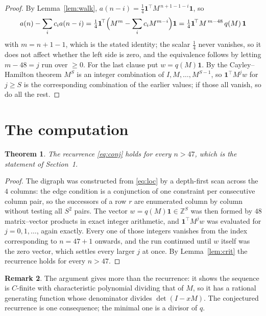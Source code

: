 \documentclass[11pt,a4paper]{article}
\theoremstyle{plain}
\newtheorem{theorem}{Theorem}
\theoremstyle{definition}
\newtheorem{remark}[theorem]{Remark}
\begin{document}
\begin{proof}
By Lemma~\ref{lem:walk}, $a(n-i)=\tfrac1{4}\mathbf{1}^{\!\top}M^{\,n+1-1-i}\mathbf{1}$, so
\[
a(n)-\sum_i c_i a(n-i)
=\tfrac1{4}\mathbf{1}^{\!\top}\Bigl(M^{m}-\sum_i c_i M^{m-i}\Bigr)\mathbf{1}
=\tfrac1{4}\mathbf{1}^{\!\top}M^{\,m-48}\,q(M)\,\mathbf{1}
\]
with $m=n+1-1$, which is the stated identity; the scalar $\tfrac1{4}$ never vanishes, so it does not affect whether the left side is zero, and the equivalence follows by letting
$m-48=j$ run over $\ge0$. For the last clause put $w=q(M)\mathbf{1}$. By the
Cayley--Hamilton theorem $M^{S}$ is an integer combination of $I,M,\dots,M^{S-1}$, so
$\mathbf{1}^{\!\top}M^{j}w$ for $j\ge S$ is the corresponding combination of the earlier
values; if those all vanish, so do all the rest.
\end{proof}

\section{The computation}

\begin{theorem}
The recurrence \eqref{eq:conj} holds for every $n>47$, which is the statement of
Section~1.
\end{theorem}

\begin{proof}
The digraph was constructed from \eqref{eq:loc} by a depth-first scan across the $4$
columns: the edge condition is a conjunction of one constraint per consecutive column
pair, so the successors of a row $r$ are enumerated column by column without testing all
$S^2$ pairs. The vector $w=q(M)\mathbf{1}\in\mathbb{Z}^{S}$ was then formed by $48$
matrix--vector products in exact integer arithmetic, and $\mathbf{1}^{\!\top}M^{j}w$ was
evaluated for $j=0,1,\dots$, again exactly. Every one of those integers vanishes from the
index corresponding to $n=47+1$ onwards, and the run continued until $w$ itself was the
zero vector, which settles every larger $j$ at once. By Lemma~\ref{lem:crit} the recurrence
holds for every $n>47$.
\end{proof}

\begin{remark}
The argument gives more than the recurrence: it shows the sequence is $C$-finite with
characteristic polynomial dividing that of $M$, so it has a rational generating function
whose denominator divides $\det(I-xM)$. The conjectured recurrence is one consequence; the
minimal one is a divisor of $q$.
\end{remark}
\end{document}
